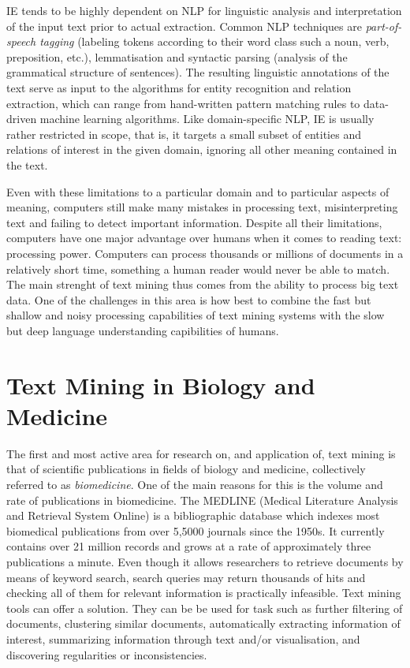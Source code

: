 IE tends to be highly dependent on NLP for linguistic analysis and interpretation of the input text prior to actual extraction.
Common NLP techniques are \emph{part-of-speech tagging} (labeling tokens according to their word class such a noun, verb, preposition, etc.), lemmatisation and syntactic parsing (analysis of the grammatical structure of sentences).
The resulting linguistic annotations of the text serve as input to the algorithms for entity recognition and relation extraction, which can range from hand-written pattern matching rules to data-driven machine learning algorithms.
Like domain-specific NLP, IE is usually rather restricted in scope, that is, it targets a small subset of entities and relations of interest in the given domain, ignoring all other meaning contained in the text.    

Even with these limitations to a particular domain and to particular aspects of meaning, computers still make many mistakes in processing text, misinterpreting text and failing to detect important information.
Despite all their limitations, computers have one major advantage over humans when it comes to reading text: processing power. 
Computers can process thousands or millions of documents in a relatively short time, something a human reader would never be able to match.
The main strenght of text mining thus comes from the ability to process big text data.
One of the challenges in this area is how best to combine the fast but shallow and noisy processing capabilities of text mining systems with the slow but deep language understanding capibilities of humans.

\section{Text Mining in Biology and Medicine}
\label{sec:tm-biomed}

The first and most active area for research on, and application of, text mining is that of scientific publications in fields of biology and medicine, collectively referred to as \emph{biomedicine}.
One of the main reasons for this is the volume and rate of publications in biomedicine.
The MEDLINE (Medical Literature Analysis and Retrieval System Online) is a bibliographic database which indexes most biomedical publications from over 5,5000 journals since the 1950s.  
It currently contains over 21 million records and grows at a rate of approximately three publications a minute.
Even though it allows researchers to retrieve documents by means of keyword search, search queries may return thousands of hits and checking all of them for relevant information is practically infeasible.
Text mining tools can offer a solution.
They can be be used for task such as further filtering of documents, clustering similar documents, automatically extracting information of interest, summarizing information through text and/or visualisation, and discovering regularities or inconsistencies.

